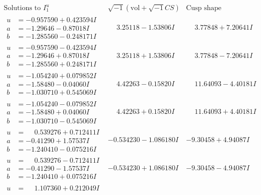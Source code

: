\documentclass[1p]{elsarticle_modified}
\theoremstyle{definition}
\newcommand{\I}{\sqrt{-1}}
\begin{document}
$$\begin{array}{c|c|c}  
\text{Solutions to }I^u_{1}& \I (\text{vol} + \sqrt{-1}CS) & \text{Cusp shape}\\
 \hline 
\begin{aligned}
u &= -0.957590 + 0.423594 I \\
a &= -1.29646 - 0.87018 I \\
b &= -1.285560 - 0.248171 I\end{aligned}
 & \phantom{-}3.25118 - 1.53806 I & \phantom{-}3.77848 + 7.20641 I \\ \hline\begin{aligned}
u &= -0.957590 - 0.423594 I \\
a &= -1.29646 + 0.87018 I \\
b &= -1.285560 + 0.248171 I\end{aligned}
 & \phantom{-}3.25118 + 1.53806 I & \phantom{-}3.77848 - 7.20641 I \\ \hline\begin{aligned}
u &= -1.054240 + 0.079852 I \\
a &= -1.58480 - 0.04060 I \\
b &= -1.030710 + 0.545069 I\end{aligned}
 & \phantom{-}4.42263 - 0.15820 I & \phantom{-}11.64093 - 4.40181 I \\ \hline\begin{aligned}
u &= -1.054240 - 0.079852 I \\
a &= -1.58480 + 0.04060 I \\
b &= -1.030710 - 0.545069 I\end{aligned}
 & \phantom{-}4.42263 + 0.15820 I & \phantom{-}11.64093 + 4.40181 I \\ \hline\begin{aligned}
u &= \phantom{-}0.539276 + 0.712411 I \\
a &= -0.41290 + 1.57537 I \\
b &= -1.240410 - 0.075216 I\end{aligned}
 & -0.534230 - 1.086180 I & -9.30458 + 4.94087 I \\ \hline\begin{aligned}
u &= \phantom{-}0.539276 - 0.712411 I \\
a &= -0.41290 - 1.57537 I \\
b &= -1.240410 + 0.075216 I\end{aligned}
 & -0.534230 + 1.086180 I & -9.30458 - 4.94087 I \\ \hline\begin{aligned}
u &= \phantom{-}1.107360 + 0.212049 I \\

\end{aligned}
\end{array}$$
\end{document}
